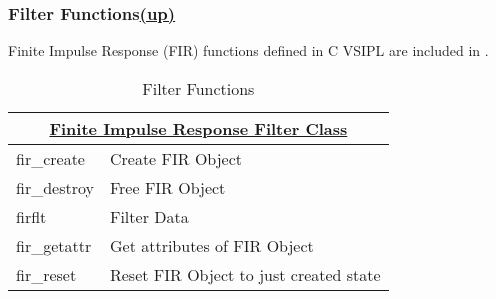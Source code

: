 \subsubsection*{Filter Functions\hspace*{\fill}\hyperlink{SignalProcessing}{(up)}\hypertarget{filterFunctions}{}} 
Finite Impulse Response (FIR) functions defined in C VSIPL are included in \pyjv. 
\begin{table}[H]
\caption{Filter Functions}
\label{tab:filterFunctions}
\begin{center}
\begin{tabular}{|l|l|}
\multicolumn{2}{c}{\hyperlink{firFunc}{\rmfamily \bfseries Finite Impulse Response Filter Class}} \\ \hline
fir\_create & Create FIR Object\\
fir\_destroy & Free FIR Object\\
firflt & Filter Data\\
fir\_getattr & Get attributes of FIR Object\\
fir\_reset & Reset FIR Object to just created state\\ \hline
\end{tabular}
\end{center}
\label{default}
\end{table}%